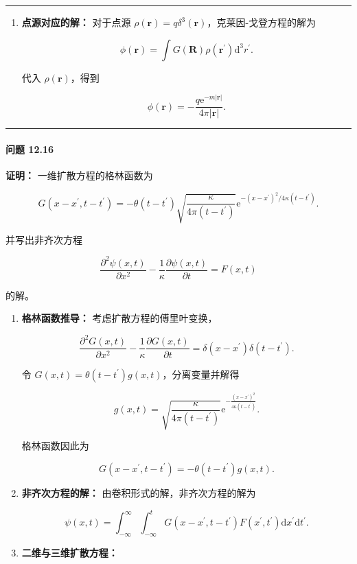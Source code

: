 \begin{center}\rule{0.5\linewidth}{0.5pt}\end{center}

\begin{enumerate}
\def\labelenumi{\arabic{enumi}.}
\setcounter{enumi}{2}
\item
  \textbf{点源对应的解：} 对于点源
  \(\rho(\mathbf{r})=q \delta^{3}(\mathbf{r})\)，克莱因-戈登方程的解为

  \[
  \phi(\mathbf{r}) = \int G(\mathbf{R}) \rho(\mathbf{r}^{\prime}) \mathrm{d}^{3} r^{\prime}.
  \]

  代入 \(\rho(\mathbf{r})\)，得到

  \[
  \phi(\mathbf{r}) = -\frac{q \mathrm{e}^{-m |\mathbf{r}|}}{4 \pi |\mathbf{r}|}.
  \]
\end{enumerate}

\begin{center}\rule{0.5\linewidth}{0.5pt}\end{center}

\paragraph{问题 12.16}\label{ux95eeux9898-12.16}

\textbf{证明：} 一维扩散方程的格林函数为

\[
G\left(x-x^{\prime}, t-t^{\prime}\right)=-\theta\left(t-t^{\prime}\right) \sqrt{\frac{\kappa}{4 \pi\left(t-t^{\prime}\right)}} \mathrm{e}^{-\left(x-x^{\prime}\right)^{2} / 4 \kappa\left(t-t^{\prime}\right)}.
\]

并写出非齐次方程

\[
\frac{\partial^{2} \psi(x, t)}{\partial x^{2}}-\frac{1}{\kappa} \frac{\partial \psi(x, t)}{\partial t}=F(x, t)
\]

的解。
\begin{enumerate}

\item
  \textbf{格林函数推导：} 考虑扩散方程的傅里叶变换，

  \[
  \frac{\partial^{2} G(x, t)}{\partial x^{2}}-\frac{1}{\kappa} \frac{\partial G(x, t)}{\partial t} = \delta(x-x^{\prime}) \delta(t-t^{\prime}).
  \]

  令 \(G(x, t)=\theta(t-t^{\prime}) g(x, t)\)，分离变量并解得

  \[
  g(x, t) = \sqrt{\frac{\kappa}{4 \pi (t-t^{\prime})}} \mathrm{e}^{-\frac{\left(x-x^{\prime}\right)^{2}}{4 \kappa (t-t^{\prime})}}.
  \]

  格林函数因此为

  \[
  G(x-x^{\prime}, t-t^{\prime}) = -\theta(t-t^{\prime}) g(x, t).
  \]

\item
  \textbf{非齐次方程的解：} 由卷积形式的解，非齐次方程的解为

  \[
  \psi(x, t) = \int_{-\infty}^{\infty} \int_{-\infty}^{t} G(x-x^{\prime}, t-t^{\prime}) F(x^{\prime}, t^{\prime}) \mathrm{d} x^{\prime} \mathrm{d} t^{\prime}.
  \]



\item
  \textbf{二维与三维扩散方程：}
\end{enumerate}

